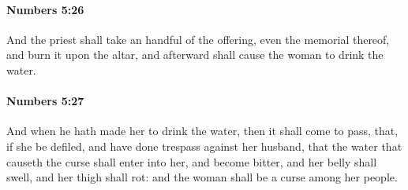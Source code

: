 		\paragraph{Numbers 5:26} %
			\label{NUMBERS-5-26}

			And the priest shall take an handful of the offering, even the memorial thereof, and burn it upon the altar, and afterward shall cause the woman to drink the water.


		\paragraph{Numbers 5:27} %
			\label{NUMBERS-5-27}

			And when he hath made her to drink the water, then it shall come to pass, that, if she be defiled, and have done trespass against her husband, that the water that causeth the curse shall enter into her, and become bitter, and her belly shall swell, and her thigh shall rot: and the woman shall be a curse among her people.

